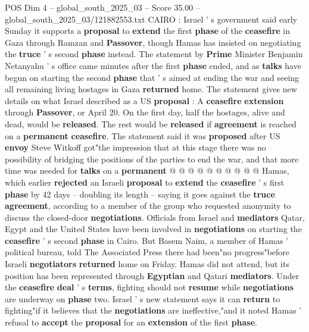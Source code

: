 \begin{textsample}{POS Dim 4 – global\_south\_2025\_03 – Score 35.00 – global\_south\_2025\_03/121882553.txt}  \label{ex:f4_pos_032}
CAIRO : Israel ' s government said early Sunday it supports a \textbf{proposal} to \textbf{extend} the first \textbf{phase} of the \textbf{ceasefire} in Gaza through Ramzan and \textbf{Passover}, though Hamas has insisted on negotiating the \textbf{truce} ' s second \textbf{phase} instead.
The statement by \textbf{Prime} Minister Benjamin Netanyahu ' s office came minutes after the first \textbf{phase} ended, and as \textbf{talks} have begun on starting the second \textbf{phase} that ' s aimed at ending the war and seeing all remaining living hostages in Gaza \textbf{returned} home.
The statement gives new details on what Israel described as a US \textbf{proposal} : A \textbf{ceasefire} \textbf{extension} through \textbf{Passover}, or April 20.
On the first day, half the hostages, alive and dead, would be \textbf{released}.
The rest would be \textbf{released} if \textbf{agreement} is reached on a \textbf{permanent} \textbf{ceasefire}.
The statement said it was \textbf{proposed} after US \textbf{envoy} Steve Witkoff got"the impression that at this stage there was no possibility of bridging the positions of the parties to end the war, and that more time was needed for \textbf{talks} on a \textbf{permanent} @ @ @ @ @ @ @ @ @ @ Hamas, which earlier \textbf{rejected} an Israeli \textbf{proposal} to \textbf{extend} the \textbf{ceasefire} ' s first \textbf{phase} by 42 days -- doubling its length -- saying it goes against the \textbf{truce} \textbf{agreement}, according to a member of the group who requested anonymity to discuss the closed-door \textbf{negotiations}.
Officials from Israel and \textbf{mediators} Qatar, Egypt and the United States have been involved in \textbf{negotiations} on starting the \textbf{ceasefire} ' s second \textbf{phase} in Cairo.
But Basem Naim, a member of Hamas ' political bureau, told The Associated Press there had been"no progress"before Israeli \textbf{negotiators} \textbf{returned} home on Friday.
Hamas did not attend, but its position has been represented through \textbf{Egyptian} and Qatari \textbf{mediators}.
Under the \textbf{ceasefire} \textbf{deal} ' s \textbf{terms}, fighting should not \textbf{resume} while \textbf{negotiations} are underway on \textbf{phase} two.
Israel ' s new statement says it can \textbf{return} to fighting"if it believes that the \textbf{negotiations} are ineffective,"and it noted Hamas ' refusal to \textbf{accept} the \textbf{proposal} for an \textbf{extension} of the first \textbf{phase}.

\end{textsample}
